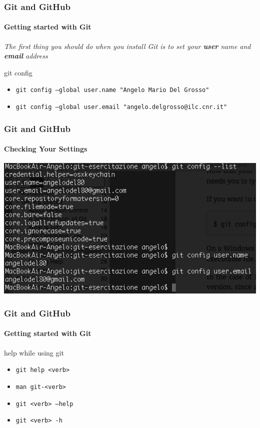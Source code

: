 \begin{frame}
    \frametitle{Git and GitHub}
    \framesubtitle{Getting started with Git}
    \addtocounter{nframe}{1}
	
	\emph{The first thing you should do when you install Git is to set your \textbf{user} name and \textbf{email} address
	}

	\begin{block}{git config}
		\begin{itemize}
			\item \texttt{git config --global user.name "Angelo Mario Del Grosso"}
			\item \texttt{git config --global user.email "angelo.delgrosso@ilc.cnr.it"}
		\end{itemize}
    \end{block}

\end{frame}

\begin{frame}
	\frametitle{Git and GitHub}
    \framesubtitle{Checking Your Settings}
    \addtocounter{nframe}{1}

	\begin{center}
		\includegraphics[width=.95\textwidth]{imgs/git-config.png}
	\end{center}

\end{frame}

\begin{frame}
    \frametitle{Git and GitHub}
    \framesubtitle{Getting started with Git}
    \addtocounter{nframe}{1}
	
	\begin{block}{help while using git}
		\begin{itemize}
			\item \texttt{git help <verb>}
			\item \texttt{man git-<verb>}
			\item \texttt{git <verb> --help}
			\item \texttt{git <verb> -h}
		\end{itemize}
    \end{block}

\end{frame}


